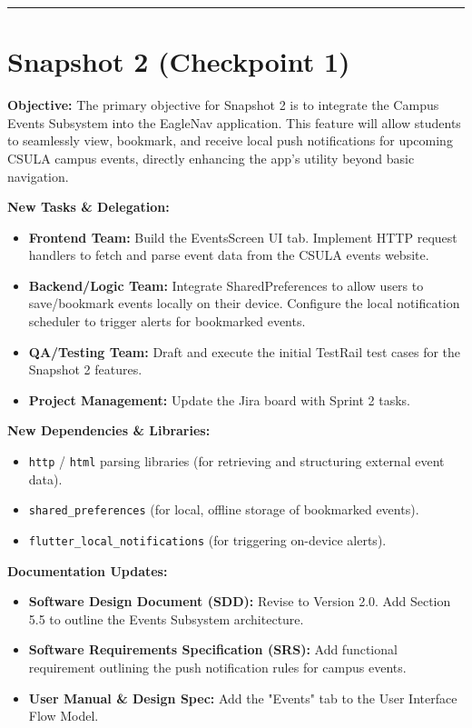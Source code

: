\documentclass[12pt]{article}
\begin{document}
\vspace{0.5cm}
\hrule
\vspace{0.5cm}

\section*{Snapshot 2 (Checkpoint 1)}
\textbf{Objective:} 
The primary objective for Snapshot 2 is to integrate the Campus Events Subsystem into the EagleNav application. This feature will allow students to seamlessly view, bookmark, and receive local push notifications for upcoming CSULA campus events, directly enhancing the app's utility beyond basic navigation.

\textbf{New Tasks \& Delegation:}
\begin{itemize}[noitemsep]
    \item \textbf{Frontend Team:} Build the EventsScreen UI tab. Implement HTTP request handlers to fetch and parse event data from the CSULA events website. 
    \item \textbf{Backend/Logic Team:} Integrate SharedPreferences to allow users to save/bookmark events locally on their device. Configure the local notification scheduler to trigger alerts for bookmarked events.
    \item \textbf{QA/Testing Team:} Draft and execute the initial TestRail test cases for the Snapshot 2 features.
    \item \textbf{Project Management:} Update the Jira board with Sprint 2 tasks.
\end{itemize}

\textbf{New Dependencies \& Libraries:}
\begin{itemize}[noitemsep]
    \item \texttt{http} / \texttt{html} parsing libraries (for retrieving and structuring external event data).
    \item \texttt{shared\_preferences} (for local, offline storage of bookmarked events).
    \item \texttt{flutter\_local\_notifications} (for triggering on-device alerts).
\end{itemize}

\textbf{Documentation Updates:}
\begin{itemize}[noitemsep]
    \item \textbf{Software Design Document (SDD):} Revise to Version 2.0. Add Section 5.5 to outline the Events Subsystem architecture.
    \item \textbf{Software Requirements Specification (SRS):} Add functional requirement outlining the push notification rules for campus events.
    \item \textbf{User Manual \& Design Spec:} Add the "Events" tab to the User Interface Flow Model.
\end{itemize}
\end{document}

